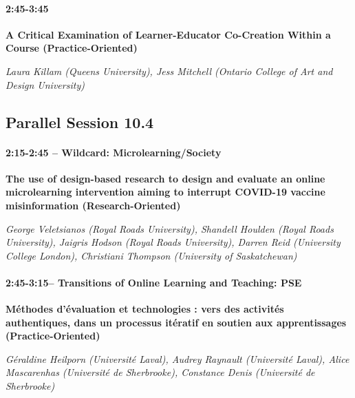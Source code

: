 \documentclass[
]{book}
\begin{document}
\begin{secondary}
\hypertarget{section}{%
\paragraph{2:45-3:45}\label{section}}

\textbf{A Critical Examination of Learner-Educator Co-Creation Within a
Course (Practice-Oriented)}

\emph{Laura Killam (Queens University), Jess Mitchell (Ontario College
of Art and Design University)}
\end{secondary}

\hypertarget{parallel-session-10.4}{%
\subsection*{Parallel Session 10.4}\label{parallel-session-10.4}}

\begin{secondary}
\hypertarget{wildcard-microlearningsociety}{%
\paragraph{2:15-2:45 -- Wildcard:
Microlearning/Society}\label{wildcard-microlearningsociety}}

\textbf{The use of design-based research to design and evaluate an
online microlearning intervention aiming to interrupt COVID-19 vaccine
misinformation (Research-Oriented)}

\emph{George Veletsianos (Royal Roads University), Shandell Houlden
(Royal Roads University), Jaigris Hodson (Royal Roads University),
Darren Reid (University College London), Christiani Thompson (University
of Saskatchewan)}
\end{secondary}

\begin{secondary}
\hypertarget{transitions-of-online-learning-and-teaching-pse}{%
\paragraph{2:45-3:15-- Transitions of Online Learning and Teaching:
PSE}\label{transitions-of-online-learning-and-teaching-pse}}

\textbf{Méthodes d'évaluation et technologies : vers des activités
authentiques, dans un processus itératif en soutien aux apprentissages
(Practice-Oriented)}

\emph{Géraldine Heilporn (Université Laval), Audrey Raynault (Université
Laval), Alice Mascarenhas (Université de Sherbrooke), Constance Denis
(Université de Sherbrooke)}
\end{secondary}
\end{document}
